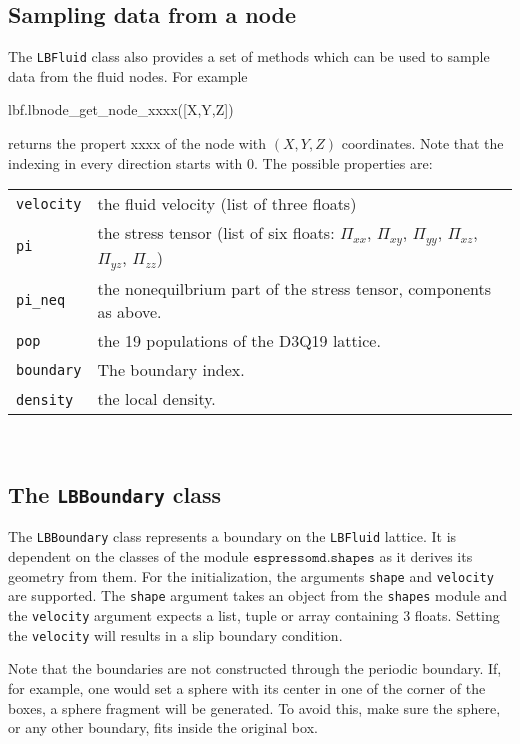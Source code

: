 \subsection*{Sampling data from a node}
The \texttt{LBFluid} class also provides a set of methods which can be used to
sample data from the fluid nodes. For example 
\vspace{0,2cm}
\begin{pypresso}
  lbf.lbnode_get_node_xxxx([X,Y,Z])
\end{pypresso}
\vspace{0,2cm}
returns the propert xxxx of the node with $(X,Y,Z)$ coordinates. Note that the
indexing in every direction starts with 0. The possible properties are:
\vspace{0,8cm}
\begin{tabular}{p{}p{}}
  \texttt{velocity} & the fluid velocity (list of three floats) \\
  \texttt{pi} & the stress tensor (list of six floats: $\Pi_{xx}$, $\Pi_{xy}$, $\Pi_{yy}$, $\Pi_{xz}$,  $\Pi_{yz}$,  $\Pi_{zz}$) \\
  \texttt{pi\_neq} & the nonequilbrium part of the stress tensor, components as above. \\
  \texttt{pop} & the 19 populations of the D3Q19 lattice.\\
  \texttt{boundary} & The boundary index.\\
  \texttt{density}\ & the local density. 
\end{tabular} \\
\vspace{0,8cm}

\subsection*{The \texttt{LBBoundary} class}
The \texttt{LBBoundary} class represents a boundary on the \texttt{LBFluid}
lattice. It is dependent on the classes of the module $\texttt{espressomd.shapes}$ as it
derives its geometry from them. For the initialization, the arguments
\texttt{shape} and \texttt{velocity} are supported. The \texttt{shape} argument
takes an object from the \texttt{shapes} module and the \texttt{velocity}
argument expects a list, tuple or array containing 3 floats. Setting the
\texttt{velocity} will results in a slip boundary condition.

Note that the boundaries are not constructed
through the periodic boundary. If, for example, one would set a sphere with
its center in one of the corner of the boxes, a sphere fragment will be
generated. To avoid this, make sure the sphere, or any other boundary, fits
inside the original box.

